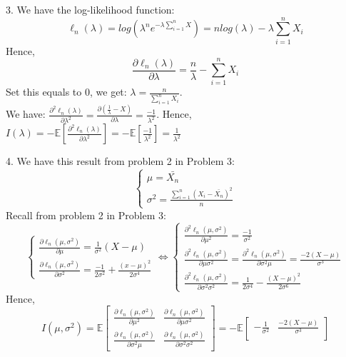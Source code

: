 \documentclass[10pt]{article}
\newenvironment{problem}[2][Problem]{\begin{trivlist}
\item[\hskip \labelsep {\bfseries #1}\hskip \labelsep {\bfseries #2.}]}{\end{trivlist}}
\begin{document}
\begin{problem}{1}
\item 3. 
We have the log-likelihood function:  
\[\ell_n(\lambda) = log(\lambda^n e^{-\lambda \sum_{i=1}^{n} X})=nlog(\lambda)-\lambda\sum_{i=1}^{n}X_i \]
Hence,
\[\frac{\partial\ell_n(\lambda)}{\partial \lambda}=\frac{n}{\lambda} - \sum_{i=1}^{n}X_i \]
Set this equals to 0, we get: $\lambda=\frac{n}{\sum_{i=1}^{n}X_i}$.\\
We have: $\frac{\partial^2\ell_n(\lambda)}{\partial \lambda^2}= \frac{\partial (\frac{1}{\lambda} - X)}{\partial \lambda}=\frac{-1}{\lambda^2}$. Hence, $I(\lambda)= -\mathbb{E}[\frac{\partial^2\ell_n(\lambda)}{\partial \lambda^2}]= -\mathbb{E}[\frac{-1}{\lambda^2}]=\frac{1}{\lambda^2}$\\
\item 4.
We have this result from problem 2 in Problem 3: \[\begin{cases} \mu=\bar{X_n}\\ \sigma^2=\frac{\sum_{i=1}^n(X_i-\bar{X_n})^2}{n}\end{cases}\]
Recall from problem 2 in Problem 3:
\[ \begin{cases} \frac{\partial \ell_n(\mu, \sigma^2)}{\partial \mu} = \frac{1}{\sigma^2}(X - \mu) \\\frac{\partial \ell_n(\mu, \sigma^2)}{\partial \sigma^2} = \frac{-1}{2\sigma^2} + \frac{(x-\mu)^2}{2\sigma^4} \end{cases} \Leftrightarrow \begin{cases} \frac{\partial^2  \ell_n(\mu, \sigma^2)}{\partial \mu^2} = \frac{-1}{\sigma^2} \\ \frac{\partial^2  \ell_n(\mu, \sigma^2)}{\partial \mu \sigma^2}= \frac{\partial^2  \ell_n(\mu, \sigma^2)}{\partial \sigma^2 \mu}= \frac{-2(X-\mu)}{\sigma^3} \\  \frac{\partial^2  \ell_n(\mu, \sigma^2)}{\partial \sigma^2 \sigma^2} = \frac{1}{2\sigma^4} - \frac{(X-\mu)^2}{2\sigma^6} \end{cases}\]
Hence, 
\[ I(\mu, \sigma^2)=\mathbb{E} \begin{bmatrix}
    \frac{\partial \ell_n(\mu, \sigma^2)}{\partial \mu^2} & \frac{\partial \ell_n(\mu, \sigma^2)}{\partial \mu \sigma^2}\\
    \frac{\partial \ell_n(\mu, \sigma^2)}{\partial \sigma^2 \mu} & \frac{\partial \ell_n(\mu, \sigma^2)}{\partial \sigma^2 \sigma^2}
\end{bmatrix} = -\mathbb{E} \begin{bmatrix}
    -\frac{1}{\sigma^2} & \frac{-2(X-\mu)}{\sigma^3} \\

\end{bmatrix}\]
\end{problem}
\end{document}
